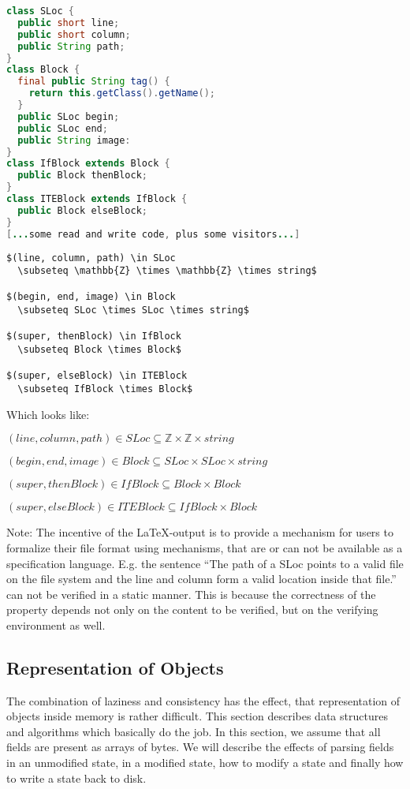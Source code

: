 \begin{lstlisting}[label=javaExample,caption=Java Examples,language=Java]
class SLoc {
  public short line;
  public short column;
  public String path;
}
class Block {
  final public String tag() {
    return this.getClass().getName();
  }
  public SLoc begin;
  public SLoc end;
  public String image:
}
class IfBlock extends Block {
  public Block thenBlock;
}
class ITEBlock extends IfBlock {
  public Block elseBlock;
}
[...some read and write code, plus some visitors...]
\end{lstlisting}


\begin{lstlisting}[label=latexExample,caption=LaTeX Examples,language={[LaTeX]TeX}]
$(line, column, path) \in SLoc
  \subseteq \mathbb{Z} \times \mathbb{Z} \times string$

$(begin, end, image) \in Block
  \subseteq SLoc \times SLoc \times string$

$(super, thenBlock) \in IfBlock
  \subseteq Block \times Block$

$(super, elseBlock) \in ITEBlock
  \subseteq IfBlock \times Block$
\end{lstlisting}
Which looks like:

$(line, column, path) \in SLoc \subseteq \mathbb{Z} \times \mathbb{Z} \times string$

$(begin, end, image) \in Block \subseteq SLoc \times SLoc \times string$

$(super, thenBlock) \in IfBlock \subseteq Block \times Block$

$(super, elseBlock) \in ITEBlock \subseteq IfBlock \times Block$

Note: The incentive of the \LaTeX-output is to provide a mechanism for users to formalize their file format using mechanisms, that are or can not be available as a specification language. E.g. the sentence ``The path of a SLoc points to a valid file on the file system and the line and column form a valid location inside that file.'' can not be verified in a static manner. This is because the correctness of the property depends not only on the content to be verified, but on the verifying environment as well.


\subsection{Representation of Objects}

The combination of laziness and consistency has the effect, that representation of objects inside memory is rather difficult. This section describes data structures and algorithms which basically do the job. In this section, we assume that all fields are present as arrays of bytes. We will describe the effects of parsing fields in an unmodified state, in a modified state, how to modify a state and finally how to write a state back to disk.

